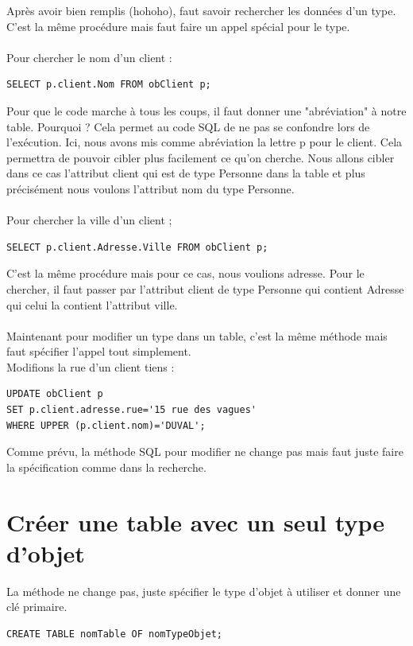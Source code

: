 \documentclass{report}
\begin{document}
Après avoir bien remplis (hohoho), faut savoir rechercher les données d'un type. C'est la même procédure mais faut faire un appel spécial pour le type.\\ \\

Pour chercher le nom d'un client :
\begin{lstlisting}[style=MySQLStyle]
SELECT p.client.Nom FROM obClient p;
\end{lstlisting}
Pour que le code marche à tous les coups, il faut donner une "abréviation" à notre table. Pourquoi ? Cela permet au code SQL de ne pas se confondre lors de l'exécution. Ici, nous avons mis comme abréviation la lettre p pour le client. Cela permettra de pouvoir cibler plus facilement ce qu'on cherche. Nous allons cibler dans ce cas l'attribut client qui est de type Personne dans la table et plus précisément nous voulons l'attribut nom du type Personne.\\ \\

Pour chercher la ville d'un client ;
\begin{lstlisting}[style=MySQLStyle]
SELECT p.client.Adresse.Ville FROM obClient p;
\end{lstlisting}
C'est la même procédure mais pour ce cas, nous voulions adresse. Pour le chercher, il faut passer par l'attribut client de type Personne qui contient Adresse qui celui la contient l'attribut ville. \\ \\

Maintenant pour modifier un type dans un table, c'est la même méthode mais faut spécifier l'appel tout simplement.\\
Modifions la rue d'un client tiens :
\begin{lstlisting}[style=MySQLStyle]
UPDATE obClient p
SET p.client.adresse.rue='15 rue des vagues'
WHERE UPPER (p.client.nom)='DUVAL';
\end{lstlisting}
Comme prévu, la méthode SQL pour modifier ne change pas mais faut juste faire la spécification comme dans la recherche.

\section{Créer une table avec un seul type d'objet}
La méthode ne change pas, juste spécifier le type d'objet à utiliser et donner une clé primaire.
\begin{lstlisting}[style=MySQLStyle]
CREATE TABLE nomTable OF nomTypeObjet;
\end{lstlisting}
\end{document}
